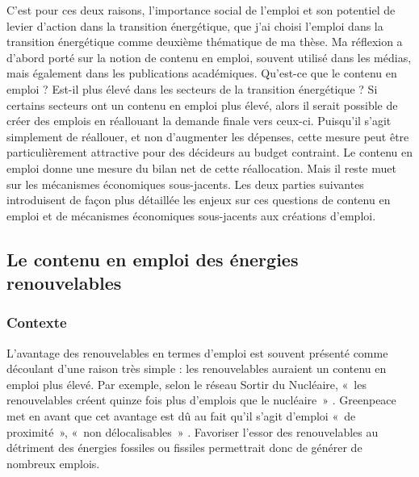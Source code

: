 C’est pour ces deux raisons, l’importance social de l’emploi et son potentiel de levier d’action dans la transition énergétique, que j’ai choisi l’emploi dans la transition énergétique comme deuxième thématique de ma thèse.
Ma réflexion a d’abord porté sur la notion de contenu en emploi, souvent utilisé dans les médias, mais également dans les publications académiques. Qu’est-ce que le contenu en emploi ? Est-il plus élevé dans les secteurs de la transition énergétique ? 
Si certains secteurs ont un contenu en emploi plus élevé, alors il serait possible de créer des emplois en réallouant la demande finale vers ceux-ci. Puisqu’il s’agit simplement de réallouer, et non d’augmenter les dépenses, cette mesure peut être particulièrement attractive pour des décideurs au budget contraint. Le contenu en emploi donne une mesure du bilan net de cette réallocation. Mais il reste muet sur les mécanismes économiques sous-jacents. 
Les deux parties suivantes introduisent de façon plus détaillée les enjeux sur ces questions de contenu en emploi et de mécanismes économiques sous-jacents aux créations d’emploi.




\subsection{Le contenu en emploi des énergies renouvelables}

\subsubsection{Contexte}
L’avantage des renouvelables en termes d’emploi est souvent présenté comme découlant d'une raison très simple : les renouvelables auraient un contenu en emploi plus élevé. Par exemple, selon le réseau Sortir du Nucléaire, «~les renouvelables créent quinze fois plus d’emplois que le nucléaire~» \citep{Les7ventsduCotentin2009}. Greenpeace met en avant que cet avantage est dû au fait qu’il s’agit d’emploi «~de proximité~», «~non délocalisables~» \citep{Greenpeace2011}. Favoriser l’essor des renouvelables au détriment des énergies fossiles ou fissiles permettrait donc de générer de nombreux emplois.

